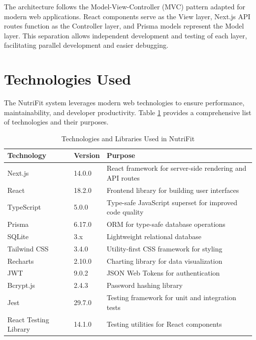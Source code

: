 The architecture follows the Model-View-Controller (MVC) pattern adapted for modern web applications. React components serve as the View layer, Next.js API routes function as the Controller layer, and Prisma models represent the Model layer. This separation allows independent development and testing of each layer, facilitating parallel development and easier debugging.

\section{Technologies Used}

The NutriFit system leverages modern web technologies to ensure performance, maintainability, and developer productivity. Table \ref{tab:technologies} provides a comprehensive list of technologies and their purposes.

\begin{table}[H]
\centering
\caption{Technologies and Libraries Used in NutriFit}
\label{tab:technologies}
\begin{tabular}{|p{3cm}|p{3cm}|p{7cm}|}
\hline
\textbf{Technology} & \textbf{Version} & \textbf{Purpose} \\
\hline
Next.js & 14.0.0 & React framework for server-side rendering and API routes \\
\hline
React & 18.2.0 & Frontend library for building user interfaces \\
\hline
TypeScript & 5.0.0 & Type-safe JavaScript superset for improved code quality \\
\hline
Prisma & 6.17.0 & ORM for type-safe database operations \\
\hline
SQLite & 3.x & Lightweight relational database \\
\hline
Tailwind CSS & 3.4.0 & Utility-first CSS framework for styling \\
\hline
Recharts & 2.10.0 & Charting library for data visualization \\
\hline
JWT & 9.0.2 & JSON Web Tokens for authentication \\
\hline
Bcrypt.js & 2.4.3 & Password hashing library \\
\hline
Jest & 29.7.0 & Testing framework for unit and integration tests \\
\hline
React Testing Library & 14.1.0 & Testing utilities for React components \\
\hline
\end{tabular}
\end{table}

